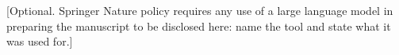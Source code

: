 \documentclass[pdflatex,sn-basic,Numbered,referee,lineno]{sn-jnl}%
\theoremstyle{thmstyleone}%
\theoremstyle{thmstyletwo}%
\theoremstyle{thmstylethree}%
\begin{document}

[Optional. Springer Nature policy requires any use of a large language model in
preparing the manuscript to be disclosed here: name the tool and state what it
was used for.]


%
%
%
%
%
%


\end{document}
